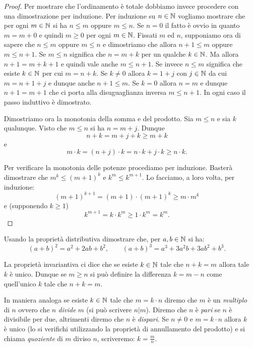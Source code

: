 \begin{proof}
Per mostrare che l'ordinamento è totale dobbiamo invece 
procedere con una dimostrazione per induzione. 
Per induzione su $n\in {\mathbb N}$ vogliamo mostrare 
che per ogni $m\in {\mathbb N}$ si ha $n\le m$ oppure $m\le n$. 
Se $n=0$ il fatto è ovvio in quanto $m=m+0$ e quindi $m\ge 0$
per ogni $m\in {\mathbb N}$.
Fissati $m$ ed $n$, supponiamo ora di sapere che $n\le m$ oppure $m\le n$
e dimostriamo che allora $n+1\le m$ oppure $m\le n+1$.
Se $m\le n$ significa che $n = m + k$ per un qualche 
$k\in {\mathbb N}$. Ma allora $n+1 = m + k + 1$ e quindi 
vale anche $m\le n+1$. 
Se invece $n\le m$ significa che esiste $k\in {\mathbb N}$ 
per cui $m=n+k$. Se $k\neq 0$ allora $k=1+j$ con $j\in {\mathbb N}$
da cui $m=n+1+j$ e dunque anche $n+1\le m$.
Se $k=0$ allora $n=m$ e dunque $n+1=m+1$ che ci porta 
alla disuguaglianza inversa $m \le n+1$.
In ogni caso il passo induttivo è dimostrato.

Dimostriamo ora la monotonia della somma e del prodotto.
Sia $m\le n$ e sia $k$ qualunque.
Visto che $m\le n$ si ha $n=m+j$. 
Dunque
\[
n+k = m + j + k \ge m+k   
\] 
e
\[
m\cdot k = (n+j)\cdot k = n\cdot k + j\cdot k \ge n\cdot k.  
\]

Per verificare la monotonia delle potenze procediamo per induzione.
Basterà dimostrare che $m^k\le(m+1)^k$ e $k^m\le k^{m+1}$.
Lo facciamo, a loro volta, per induzione:
\[
(m+1)^{k+1} = (m+1)\cdot (m+1)^k \ge m\cdot m^k
\]
e (supponendo $k\ge 1$)
\[
k^{m+1} = k\cdot k^m \ge 1\cdot k^m = k^m. 
\]
\end{proof}

\begin{exercise}
Usando la proprietà distributiva dimostrare che, per $a,b\in {\mathbb N}$ si ha:
\[
(a+b)^2 = a^2+2ab+b^2,
\qquad
(a+b)^3 = a^3 + 3a^2b + 3ab^2 + b^3.
\]
\end{exercise}

La proprietà invariantiva ci dice 
che se esiste $k\in {\mathbb N}$ tale che $n+k=m$
allora tale $k$ è unico. 
%
%
Dunque se $m\ge n$ si può definire la differenza $k=m-n$
come quell'unico $k$ tale che $n+k=m$.

In maniera analoga se esiste $k\in {\mathbb N}$ tale che $m=k\cdot n$
diremo che $m$ è un \emph{multiplo} di $n$ 
%
%
ovvero che $n$ \emph{divide} $m$ (si può scrivere $n\vert m$).
Diremo che $n$ è \emph{pari} se $n$ è divisibile per due,
altrimenti diremo che $n$ è \emph{dispari}.
Se $n\neq 0$ e $m=k\cdot n$ allora $k$ è unico 
(lo si verifichi utilizzando la proprietà di annullamento del prodotto)
e si chiama \emph{quoziente} di $m$ diviso $n$, 
%
scriveremo: $k=\frac m n$.

